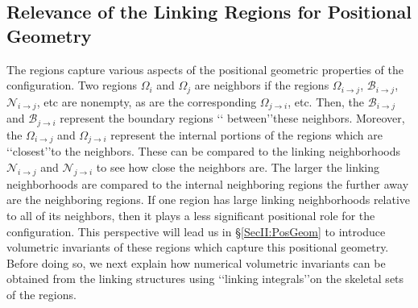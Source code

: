 \documentclass[10pt]{amsart}
\theoremstyle{definition}
\theoremstyle{definition}
\newtheorem{Remark}[Thm]{Remark}
\numberwithin{equation}{section}
\def \cB {\mathcal{B}}
\def \cN {\mathcal{N}}
\def \gW {\Omega}
\begin{document}
\subsection*{Relevance of the Linking Regions for Positional Geometry}
 \par
The regions capture various aspects of the positional geometric 
properties 
of the configuration.  Two regions $\gW_i$ and $\gW_j$ are neighbors if
the regions $\gW_{i \to j}$, $\cB_{i \to j}$, $\cN_{i \to j}$, etc are 
nonempty, as are the corresponding $\gW_{j \to i}$, etc.  Then, the $\cB_{i 
\to j}$ and $\cB_{j \to i}$ represent the boundary regions \lq\lq 
between\rq\rq these neighbors.  Moreover, the $\gW_{i \to j}$ and 
$\gW_{j \to i}$ represent the internal portions of the regions which are 
\lq\lq closest\rq\rq to the neighbors.  These can be compared to the 
linking neighborhoods $\cN_{i \to j}$ and $\cN_{j \to i}$ to see how close 
the neighbors are.  The larger the linking neighborhoods are compared to 
the internal neighboring regions the further away are the neighboring 
regions.  If one region has large linking neighborhoods relative to all of its 
neighbors, then it plays a less significant positional role for the 
configuration.  This perspective will lead us in \S \ref{SecII:PosGeom} to 
introduce volumetric invariants of these regions which capture this 
positional geometry.  Before doing so, we next explain how numerical 
volumetric invariants can be obtained from the linking structures using 
\lq\lq linking integrals\rq\rq on the skeletal sets of the regions. 
\par
\begin{comment}
\begin{Remark}
\label{RemII4.3}
\normalfont
If the configuration is subjected to a transformation formed from a 
translation, rotation, and scaling, then we would like the associated 
bounded region $\tilde \gW$ to be sent to the corresponding bounded 
region for the resulting image configuration.  Provided we also scale the 
length of vectors, a skeletal linking structure will be sent by such 
mappings to a skeletal linking structure for the image configuration.  This 
is also true for a Blum linking structure.  Thus, it is only necessary that 
the associated bounding region is constructed from geometric data from 
the configuration.  For the convex hull this is true.  For an intrinsic 
bounding region, we would require that the transformations send one 
intrinsic bounding region to another.  This will also happen for bounding 
boxes, etc. or thresholds provided any reference points, directions of 
edges, and lengths are determined by the configuration.  
\end{Remark}
\end{comment}
\par
\end{document}
